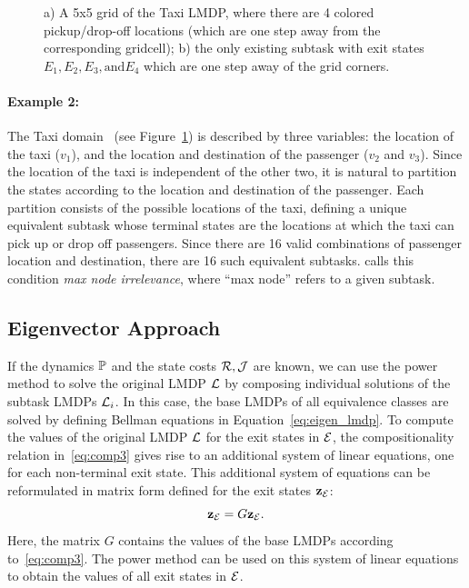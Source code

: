 \begin{figure}[!t]
    \begin{center}
        
    \end{center}
    \caption{a) A 5x5 grid of the Taxi LMDP, where there are 4 colored pickup/drop-off locations (which are one step away from the corresponding gridcell); b) the only existing subtask with exit states $E_1,E_2,E_3, \text{and} E_4$ which are one step away of the grid corners.} 
    \label{fig:domain_taxi}
\end{figure}
    

\paragraph{Example 2:} The Taxi domain~\citep{Dietterich2000} (see Figure~\ref{fig:domain_taxi}) is described by three variables: the location of the taxi ($v_1$), and the location and destination of the passenger ($v_2$ and $v_3$). Since the location of the taxi is independent of the other two, it is natural to partition the states according to the location and destination of the passenger. Each partition consists of the possible locations of the taxi, defining a unique equivalent subtask whose terminal states are the locations at which the taxi can pick up or drop off passengers. Since there are 16 valid combinations of passenger location and destination, there are 16 such equivalent subtasks.
\citep{Dietterich2000} calls this condition {\em max node irrelevance}, where ``max node'' refers to a given subtask.

\subsection{Eigenvector Approach}
\label{section:hlmdps_eigenvector_episodic}

If the dynamics $\mathbb{P}$ and the state costs $\mathcal{R}, \mathcal{J}$ are known, we can use the power method to solve the original LMDP $\mathcal{L}$ by composing individual solutions of the subtask LMDPs $\mathcal{L}_i$.
In this case, the base LMDPs of all equivalence classes are solved by defining Bellman equations in Equation~\eqref{eq:eigen_lmdp}.
To compute the values of the original LMDP $\mathcal{L}$ for the exit states in $\mathcal{E}$, the compositionality relation in~\eqref{eq:comp3} gives rise to an additional system of linear equations, one for each non-terminal exit state. This additional system of equations can be reformulated in matrix form defined for the exit states ${\bf z}_{\mathcal{E}}$:
\begin{equation}\label{eq:exits}
{\bf z}_{\mathcal{E}}=G{\bf z}_{\mathcal{E}}.
\end{equation}
Here, the matrix $G$ contains the values of the base LMDPs according to~\eqref{eq:comp3}.
The power method can be used on this system of linear equations to obtain the values of all exit states in $\mathcal{E}$.

